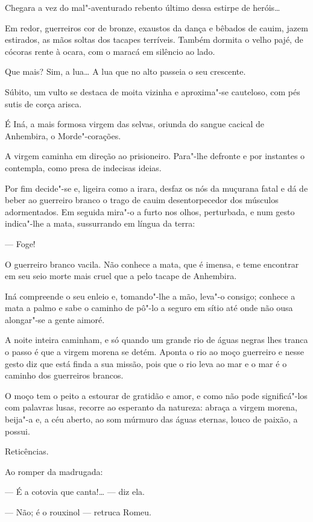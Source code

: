 Chegara a vez do mal"-aventurado rebento último dessa estirpe de
heróis\ldots{}

Em redor, guerreiros cor de bronze, exaustos da dança e bêbados de
cauim, jazem estirados, as mãos soltas dos tacapes terríveis. Também
dormita o velho pajé, de cócoras rente à ocara, com o maracá em silêncio
ao lado.

Que mais? Sim, a lua\ldots{} A lua que no alto passeia o seu crescente.

Súbito, um vulto se destaca de moita vizinha e aproxima"-se cauteloso,
com pés sutis de corça arisca.

É Iná, a mais formosa virgem das selvas, oriunda do sangue cacical de
Anhembira, o Morde"-corações.

A virgem caminha em direção ao prisioneiro. Para"-lhe defronte e por
instantes o contempla, como presa de indecisas ideias.

Por fim decide"-se e, ligeira como a irara, desfaz os nós da muçurana
fatal e dá de beber ao guerreiro branco o trago de cauim desentorpecedor
dos músculos adormentados. Em seguida mira"-o a furto nos olhos,
perturbada, e num gesto indica"-lhe a mata, sussurrando em língua da
terra:

--- Foge!

O guerreiro branco vacila. Não conhece a mata, que é imensa, e teme
encontrar em seu seio morte mais cruel que a pelo tacape de Anhembira.

Iná compreende o seu enleio e, tomando"-lhe a mão, leva"-o consigo;
conhece a mata a palmo e sabe o caminho de pô"-lo a seguro em sítio até
onde não ousa alongar"-se a gente aimoré.

A noite inteira caminham, e só quando um grande rio de águas negras lhes
tranca o passo é que a virgem morena se detém. Aponta o rio ao moço
guerreiro e nesse gesto diz que está finda a sua missão, pois que o rio
leva ao mar e o mar é o caminho dos guerreiros brancos.

O moço tem o peito a estourar de gratidão e amor, e como não pode
significá"-los com palavras lusas, recorre ao esperanto da natureza:
abraça a virgem morena, beija"-a e, a céu aberto, ao som múrmuro das
águas eternas, louco de paixão, a possui.

Reticências.

Ao romper da madrugada:

--- É a cotovia que canta!\ldots{} --- diz ela.

--- Não; é o rouxinol --- retruca Romeu.

